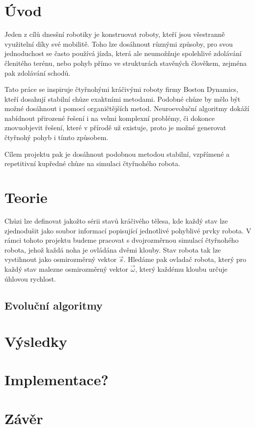 \documentclass[a4]{article}
\begin{document}
\section{Úvod} 
Jeden z cílů dnesšní robotiky je konstruovat roboty, kteří jsou všestranně využitelní díky své mobilitě. Toho lze dosáhnout různými způsoby, pro svou jednoduchost se často používá jízda, která ale neumožňuje spolehlivé zdolávání členitého terénu, nebo pohyb přímo ve strukturách stavěných člověkem, zejména pak zdolávání schodů.\par
Tato práce se inspiruje čtyřnohými kráčivými roboty firmy Boston Dynamics\cite{bostondynamics}, kteří dosahují stabilní chůze exaktními metodami.\cite{bdpaper} Podobné chůze by mělo být možné dosáhnout i pomocí organičtějších metod. Neuroevoluční algoritmy dokáží nabídnout přirozené řešení i na velmi komplexní problémy, či dokonce znovuobjevit řešení, které v přírodě už existuje, proto je možné generovat čtyřnohý pohyb i tímto způsobem.\cite{clunegait}\par
Cílem projektu pak je dosáhnout podobnou metodou stabilní, vzpřímené a repetitivní kupředné chůze na simulaci čtyřnohého robota.
 
\section{Teorie}
Chůzi lze definovat jakožto sérii stavů kráčivého tělesa, kde každý stav lze zjednodušit jako soubor informací popisující jednotlivé pohyblivé prvky robota. V rámci tohoto projektu budeme pracovat s dvojrozměrnou simulací čtyřnohého robota, jehož každá noha je ovládána dvěmi klouby. Stav robota tak lze vystihnout jako osmirozměrný vektor $\vec{s}$. Hledáme pak ovladač robota, který pro každý stav malezne osmirozměrný vektor $\vec{\omega}$, který každému kloubu určuje úhlovou rychlost.
\subsection{Evoluční algoritmy}

\section{Výsledky} 
\section{Implementace?}%
\section{Závěr} 
\end{document}

